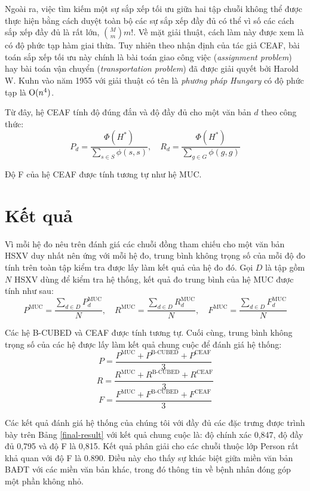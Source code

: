 Ngoài ra, việc tìm kiếm một sự sắp xếp tối ưu giữa hai tập chuỗi không thể được thực hiện bằng cách duyệt toàn bộ các sự sắp xếp đầy đủ có thể vì số các cách sắp xếp đầy đủ là rất lớn, $\binom{M}{m}m!$. Về mặt giải thuật, cách làm này được xem là có độ phức tạp hàm giai thừa. Tuy nhiên theo nhận định của tác giả CEAF, bài toán sắp xếp tối ưu này chính là bài toán giao công việc (\emph{assignment problem}) hay bài toán vận chuyển (\emph{transportation problem}) đã được giải quyết bởi Harold W. Kuhn vào năm 1955 với giải thuật có tên là \emph{phương pháp Hungary} \cite{HungarianMethod} có độ phức tạp là $\operatorname{O}(n^4)$.

Từ đây, hệ CEAF tính độ đúng đắn và độ đầy đủ cho một văn bản $d$ theo công thức:
\[P_d=\frac{\Phi(H^*)}{\sum_{s\in S} \phi(s,s)},\quad R_d=\frac{\Phi(H^*)}{\sum_{g\in G} \phi(g,g)}\]

Độ F của hệ CEAF được tính tương tự như hệ MUC.

\section{Kết quả}
Vì mỗi hệ đo nêu trên đánh giá các chuỗi đồng tham chiếu cho một văn bản HSXV duy nhất nên ứng với mỗi hệ đo, trung bình không trọng số của mỗi độ đo tính trên toàn tập kiểm tra được lấy làm kết quả của hệ đo đó. Gọi $D$ là tập gồm $N$ HSXV dùng để kiểm tra hệ thống, kết quả đo trung bình của hệ MUC được tính như sau:
\[P^{\text{MUC}}=\frac{\sum_{d\in D}P_d^{\text{MUC}}}{N},\quad R^{\text{MUC}}=\frac{\sum_{d\in D}R_d^{\text{MUC}}}{N},\quad F^{\text{MUC}}=\frac{\sum_{d\in D}F_d^{\text{MUC}}}{N}\]

Các hệ B-CUBED và CEAF được tính tương tự. Cuối cùng, trung bình không trọng số của các hệ được lấy làm kết quả chung cuộc để đánh giá hệ thống:
\[P=\frac{P^{\text{MUC}}+P^{\text{B-CUBED}}+P^{\text{CEAF}}}{3}\]
\[R=\frac{R^{\text{MUC}}+R^{\text{B-CUBED}}+R^{\text{CEAF}}}{3}\]
\[F=\frac{F^{\text{MUC}}+F^{\text{B-CUBED}}+F^{\text{CEAF}}}{3}\]

Các kết quả đánh giá hệ thống của chúng tôi với đầy đủ các đặc trưng được trình bày trên Bảng \ref{final-result} với kết quả chung cuộc là: độ chính xác 0,847, độ đầy đủ 0,795 và độ F là 0,815. Kết quả phân giải cho các chuỗi thuộc lớp Person rất khả quan với độ F là 0.890. Điều này cho thấy sự khác biệt giữa miền văn bản BAĐT với các miền văn bản khác, trong đó thông tin về bệnh nhân đóng góp một phần không nhỏ.

